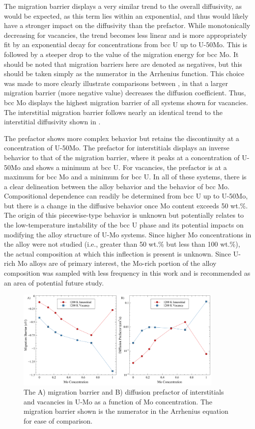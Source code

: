 \documentclass[review]{elsarticle}
\begin{document}
The migration barrier displays a very similar trend to the overall diffusivity, as would be expected, as this term lies within an exponential, and thus would likely have a stronger impact on the diffusivity than the prefactor. While monotonically decreasing for vacancies, the trend becomes less linear and is more appropriately fit by an exponential decay for concentrations from bcc U up to U-50Mo. This is followed by a steeper drop to the value of the migration energy for bcc Mo. It should be noted that migration barriers here are denoted as negatives, but this should be taken simply as the numerator in the Arrhenius function. This choice was made to more clearly illustrate comparisons between , in that a larger migration barrier (more negative value) decreases the diffusion coefficient. Thus, bcc Mo displays the highest migration barrier of all systems shown for vacancies. The interstitial migration barrier follows nearly an identical trend to the interstitial diffusivity shown in . 

The prefactor shows more complex behavior but retains the discontinuity at a concentration of U-50Mo. The prefactor for interstitials displays an inverse behavior to that of the migration barrier, where it peaks at a concentration of U-50Mo and shows a minimum at bcc U. For vacancies, the prefactor is at a maximum for bcc Mo and a minimum for bcc U. In all of these systems, there is a clear delineation between the alloy behavior and the behavior of bcc Mo. Compositional dependence can readily be determined from bcc U up to U-50Mo, but there is a change in the diffusive behavior once Mo content exceeds 50 wt.\%. The origin of this piecewise-type behavior is unknown but potentially relates to the low-temperature instability of the bcc U phase and its potential impacts on modifying the alloy structure of U-Mo systems. Since higher Mo concentrations in the alloy were not studied (i.e., greater than 50 wt.\% but less than 100 wt.\%), the actual composition at which this inflection is present is unknown. Since U-rich Mo alloys are of primary interest, the Mo-rich portion of the alloy composition was sampled with less frequency in this work and is recommended as an area of potential future study. 

\begin{figure}[h!]
    \centering
    \includegraphics[width=0.9\textwidth]{Em_D0.pdf}
    \caption{The A) migration barrier and B) diffusion prefactor of interstitials and vacancies in U-Mo as a function of Mo concentration. The migration barrier shown is the numerator in the Arrhenius equation for ease of comparison.}
    \label{fig:Em_D0}
\end{figure}
\end{document}
